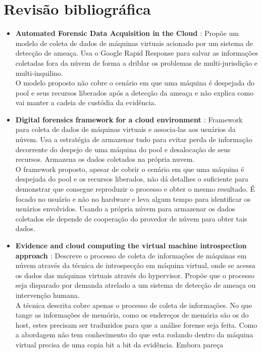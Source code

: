 \documentclass[12pt,				%
	openright,			%
	oneside,			%
	a4paper,			%
	english,			%
	brazil				%
	]{abntex2}
\begin{document}
\chapter{Revisão bibliográfica} \label{chap:related}
\begin{itemize}
 \item \textbf{Automated Forensic Data Acquisition in the Cloud \cite{Reichert2015} }: Propõe um modelo de coleta de dados de máquinas virtuais acionado por um sistema de 
 detecção de ameaça. Usa o Google Rapid Response para salvar as informações coletadas fora da núvem de forma a driblar os problemas de multi-jurisdição e multi-inquilino.\\
 O modelo proposto não cobre o cenário em que uma máquina é despejada do pool e seus recursos liberados após a detecção da ameaça e não explica como vai manter a cadeia de 
 custódia da evidência.
 \item \textbf{Digital forensics framework for a cloud environment \cite{George2012} }: Framework para coleta de dados de máquinas virtuais e associa-las aos usuários da 
 núvem. Usa a estratégia de armazenar tudo para evitar perda de informação decorrente do despejo de uma máquina do pool e desalocação de seus recursos. Armazena os dados coletados
 na própria nuvem.\\
 O framework proposto, apesar de cobrir o cenário em que uma máquina é despejada do pool e os recursos liberados, não dá detalhes o suficiente para demonstrar que consegue 
 reproduzir o processo e obter o mesmo resultado. É focado no usuário e não no hardware e leva algum tempo para identificar os usuários envolvidos. Usando a própria núvem para 
 armazenar os dados coletados ele depende de cooperação do provedor de núvem para obter tais dados.
 \item \textbf{Evidence and cloud computing the virtual machine introspection approach \cite{Poisel2013} }: Descreve o processo de coleta de informações de máquinas
 em núvem através da técnica de introspecção em máquina virtual, onde se acessa os dados das máquinas virtuais através do hypervisor. Propõe que o processo seja disparado 
 por demanda atrelado a um sistema de detecção de ameaça ou intervenção humana.\\
 A técnica descrita cobre apenas o processo de coleta de informações. No que tange as informações de memória, como os endereços de memória são os do host, estes precisam ser traduzidos
 para que a análise forense seja feita. Como a abordagem não tem conhecimento do que esta rodando dentro da máquina virtual precisa de uma copia bit a bit da evidência. Embora pareça

\end{itemize}
\end{document}
